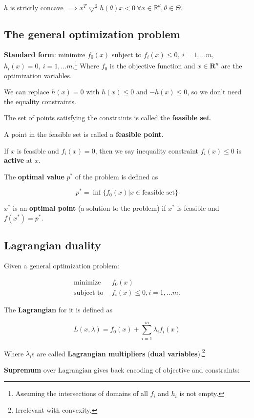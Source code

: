 \documentclass{article}
\DeclareMathOperator*{\minf}{inf}
\begin{document}
$h$ is strictly concave $\implies x^T \bigtriangledown^2 h(\theta) x < 0 ~ \forall x \in \mathbb{R}^d, \theta \in \Theta$.

\subsection{The general optimization problem}

\textbf{Standard form}: minimize $f_0(x)$ subject to $f_i(x) \leq 0, ~ i = 1, \dots m$, $h_i(x) = 0, ~ i = 1, \dots m$.\footnote{Assuming the intersections of domains of all $f_i$ and $h_i$ is not empty.}
Where $f_0$ is the objective function and $x \in \mathbf{R}^n$ are the optimization variables.

We can replace $h(x) = 0$ with $h(x) \leq 0$ and $-h(x) \leq 0$, so we don't need the equality constraints.

The set of points satisfying the constraints is called the \textbf{feasible set}.

A point in the feasible set is called a \textbf{feasible point}.

If $x$ is feasible and $f_i(x) = 0$, then we say inequality constraint $f_i(x) \leq 0$ is \textbf{active} at $x$.

The \textbf{optimal value} $p^*$ of the problem is defined as

$$
p^* = \minf{\{ f_0(x) | x \in \text{feasible set}\}}
$$

$x^*$ is an \textbf{optimal point} (a solution to the problem) if $x^*$ is feasible and $f(x^*) = p^*$.


\subsection{Lagrangian duality}

Given a general optimization problem:

\begin{align*}
\text{minimize}       & f_0(x) \\
\text{subject to} ~ ~ & f_i(x) \leq 0, i = 1, \dots m.
\end{align*}

The \textbf{Lagrangian} for it is defined as

$$
L(x, \lambda) = f_0(x) + \sum_{i = 1}^{m}{\lambda_i f_i(x)}
$$

Where $\lambda_i$s are called \textbf{Lagrangian multipliers} (\textbf{dual variables}).\footnote{Irrelevant with convexity.}

\textbf{Supremum} over Lagrangian gives back encoding of objective and constraints:
\end{document}
